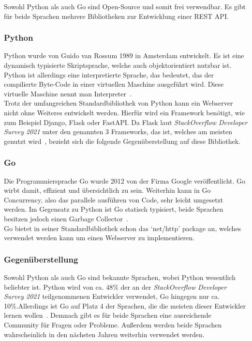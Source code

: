 Sowohl Python als auch Go sind \gls{Open-Source} und somit frei verwendbar. Es 
gibt für beide Sprachen mehrere Bibliotheken zur Entwicklung einer \gls{REST} 
\gls{API}.

\subsubsection{Python}
Python wurde von Guido van Rossum 1989 in Amsterdam entwickelt. Es ist eine 
\gls{dynamisch typisiert}e Skriptsprache, welche auch \gls{objektorientiert} nutzbar 
ist. Python ist allerdings eine interpretierte Sprache, das bedeutet, das der 
compilierte Byte-Code in einer virtuellen Maschine ausgeführt wird. Diese 
virtuelle Maschine nennt man Interpreter~\cite{ErKa20}. \\

Trotz der umfangreichen Standardbibliothek von Python kann ein Webserver nicht
ohne Weiteres entwickelt werden. Hierfür wird ein \gls{Framework} benötigt, wie 
zum Beispiel Django, Flask oder FastAPI. Da Flask laut \textit{StackOverflow 
Developer Survey 2021} unter den genannten 3 Frameworks, das ist, welches am 
meisten genutzt wird~\cite{Sta21}, bezieht sich die folgende Gegenüberstellung 
auf diese Bibliothek. \\

\subsubsection{Go}
Die Programmiersprache Go wurde 2012 von der Firma Google veröffentlicht. Go 
wirbt damit, effizient und übersichtlich zu sein. Weiterhin kann in Go 
Concurrency, also das parallele ausführen von Code, sehr leicht umgesetzt werden.
Im Gegensatz zu Python ist Go \gls{statisch typisiert}, beide Sprachen besitzen jedoch
einen \gls{Garbage Collector}~\cite{Freeman2022}. \\

Go bietet in seiner Standardbibliothek schon das `net/http' package an, welches
verwendet werden kann um einen Webserver zu implementieren. 

\subsubsection{Gegenüberstellung}
Sowohl Python als auch Go sind bekannte Sprachen, wobei Python wesentlich 
beliebter ist. Python wird von ca. 48\% der an der \textit{StackOverflow 
Developer Survey 2021} teilgenommenen Entwickler verwendet, Go hingegen nur ca. 
10\%.Allerdings ist Go auf Platz 4 der Sprachen, die die meisten dieser Entwickler
lernen wollen~\cite{Sta21}. Demnach gibt es für beide Sprachen eine ausreichende
Community für Fragen oder Probleme. Außerdem werden beide Sprachen wahrscheinlich
in den nächsten Jahren weiterhin verwendet werden. \\

